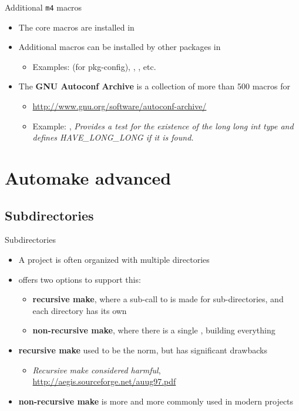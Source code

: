 \begin{frame}{Additional {\tt m4} macros}
  \begin{itemize}
  \item The core  macros are installed in
  \item Additional macros can be installed by other packages in
    \begin{itemize}
    \item Examples:  (for pkg-config),
      , , etc.
    \end{itemize}
  \item The {\bf GNU Autoconf Archive} is a collection of more than
    500 macros for 
    \begin{itemize}
    \item \url{http://www.gnu.org/software/autoconf-archive/}
    \item Example:
      , {\em Provides a test for the existence of the long long int type and defines HAVE\_LONG\_LONG if it is found.}
    \end{itemize}
  \end{itemize}
\end{frame}

\section{Automake advanced}

\subsection{Subdirectories}

\begin{frame}{Subdirectories}
  \begin{itemize}
  \item A project is often organized with multiple directories
  \item {} offers two options to support this:
    \begin{itemize}
    \item {\bf recursive make}, where a sub-call to  is made
      for sub-directories, and each directory has its own
    \item {\bf non-recursive make}, where there is a single
      , building everything
    \end{itemize}
  \item {\bf recursive make} used to be the norm, but has significant
    drawbacks
    \begin{itemize}
    \item {\em Recursive make considered harmful},
      \url{http://aegis.sourceforge.net/auug97.pdf}
    \end{itemize}
  \item {\bf non-recursive make} is more and more commonly used in
    modern projects
  \end{itemize}
\end{frame}

